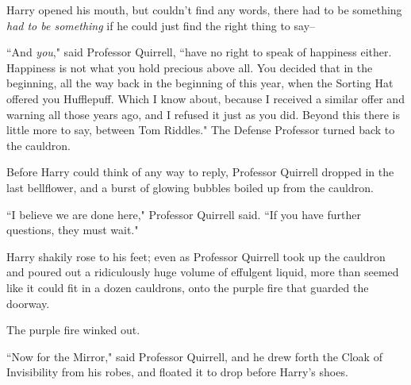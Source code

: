 Harry opened his mouth, but couldn't find any words, there had to be something \emph{had to be something} if he could just find the right thing to say\---

``And \emph{you}," said Professor Quirrell, ``have no right to speak of happiness either. Happiness is not what you hold precious above all. You decided that in the beginning, all the way back in the beginning of this year, when the Sorting Hat offered you Hufflepuff. Which I know about, because I received a similar offer and warning all those years ago, and I refused it just as you did. Beyond this there is little more to say, between Tom Riddles." The Defense Professor turned back to the cauldron.

Before Harry could think of any way to reply, Professor Quirrell dropped in the last bellflower, and a burst of glowing bubbles boiled up from the cauldron.

``I believe we are done here," Professor Quirrell said. ``If you have further questions, they must wait."

Harry shakily rose to his feet; even as Professor Quirrell took up the cauldron and poured out a ridiculously huge volume of effulgent liquid, more than seemed like it could fit in a dozen cauldrons, onto the purple fire that guarded the doorway.

The purple fire winked out.

``Now for the Mirror," said Professor Quirrell, and he drew forth the Cloak of Invisibility from his robes, and floated it to drop before Harry's shoes.

